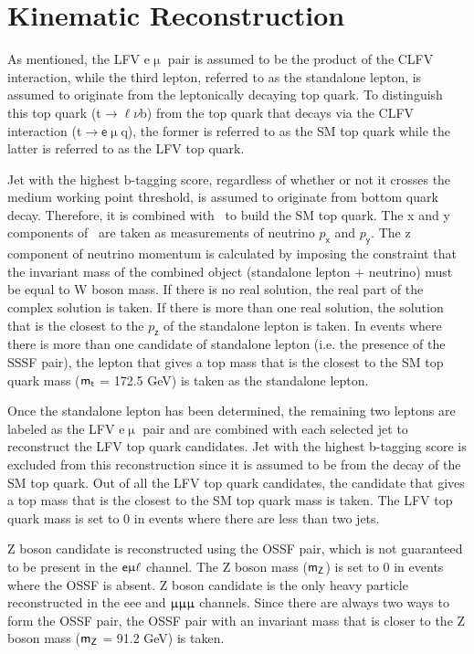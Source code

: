 \section{Kinematic Reconstruction}
\label{sec:Kin}

As mentioned, the LFV e$\upmu$ pair is assumed to be the product of the \ac{CLFV} interaction, while the third lepton, referred to as the standalone lepton, is assumed to originate from the leptonically decaying top quark. To distinguish this top quark (t$\rightarrow\ell\nu$b) from the top quark that decays via the \ac{CLFV} interaction (t$\rightarrow\textsf{e}\upmu$q), the former is referred to as the \ac{SM} top quark while the latter is referred to as the LFV top quark. 

Jet with the highest b-tagging score, regardless of whether or not it crosses the medium working point threshold, is assumed to originate from bottom quark decay. Therefore, it is combined with \MET~to build the \ac{SM} top quark. The x and y components of \MET~are taken as measurements of neutrino $p_{\textsf{x}}$ and $p_{\textsf{y}}$. The z component of neutrino momentum is calculated by imposing the constraint that the invariant mass of the combined object (standalone lepton + neutrino) must be equal to W boson mass. If there is no real solution, the real part of the complex solution is taken. If there is more than one real solution, the solution that is the closest to the $p_{\textsf{z}}$ of the standalone lepton is taken. In events where there is more than one candidate of standalone lepton (i.e. the presence of the \ac{SSSF} pair), the lepton that gives a top mass that is the closest to the \ac{SM} top quark mass ($\textsf{m}_{\textsf{t}}$ = 172.5 GeV) is taken as the standalone lepton.

Once the standalone lepton has been determined, the remaining two leptons are labeled as the LFV e$\upmu$ pair and are combined with each selected jet to reconstruct the LFV top quark candidates. Jet with the highest b-tagging score is excluded from this reconstruction since it is assumed to be from the decay of the \ac{SM} top quark. Out of all the LFV top quark candidates, the candidate that gives a top mass that is the closest to the \ac{SM} top quark mass is taken. The LFV top quark mass is set to 0 in events where there are less than two jets.

Z boson candidate is reconstructed using the \ac{OSSF} pair, which is not guaranteed to be present in the $\textsf{e}\upmu\ell$ channel. The Z boson mass ($\textsf{m}_{\textsf{Z}}$) is set to 0 in events where the \ac{OSSF} is absent. Z boson candidate is the only heavy particle reconstructed in the eee and $\upmu\upmu\upmu$ channels. Since there are always two ways to form the \ac{OSSF} pair, the \ac{OSSF} pair with an invariant mass that is closer to the Z boson mass ($\textsf{m}_{\textsf{Z}}$ = 91.2 GeV) is taken. 

